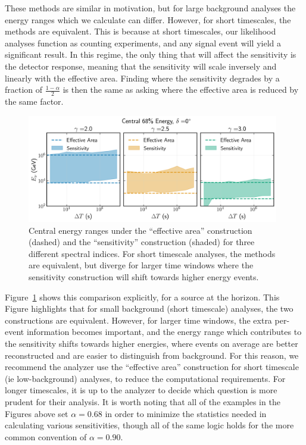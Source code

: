 \documentclass[a4paper,11pt]{article}
\begin{document}
These methods are similar in motivation, but for large background analyses the energy ranges which we calculate can differ. However, for short timescales, the methods are equivalent. This is because at short timescales, our likelihood analyses function as counting experiments, and any signal event will yield a significant result. In this regime, the only thing that will affect the sensitivity is the detector response, meaning that the sensitivity will scale inversely and linearly with the effective area. Finding where the sensitivity degrades by a fraction of $\frac{1-\alpha}{2}$ is then the same as asking where the effective area is reduced by the same factor.

\begin{figure}
    \centering
    \includegraphics[width=0.98\textwidth]{figures/central_en_comparison_gfu.png}
    \caption{Central energy ranges under the ``effective area'' construction (dashed) and the ``sensitivity'' construction (shaded) for three different spectral indices. For short timescale analyses, the methods are equivalent, but diverge for larger time windows where the sensitivity construction will shift towards higher energy events.}
    \label{fig:energy_range_comparison}
\end{figure}

Figure~\ref{fig:energy_range_comparison} shows this comparison explicitly, for a source at the horizon. This Figure highlights that for small background (short timescale) analyses, the two constructions are equivalent. However, for larger time windows, the extra per-event information becomes important, and the energy range which contributes to the sensitivity shifts towards higher energies, where events on average are better reconstructed and are easier to distinguish from background. For this reason, we recommend the analyzer use the ``effective area'' construction for short timescale (ie low-background) analyses, to reduce the computational requirements. For longer timescales, it is up to the analyzer to decide which question is more prudent for their analysis. It is worth noting that all of the examples in the Figures above set $\alpha=0.68$ in order to minimize the statistics needed in calculating various sensitivities, though all of the same logic holds for the more common convention of $\alpha=0.90$. 
\end{document}
